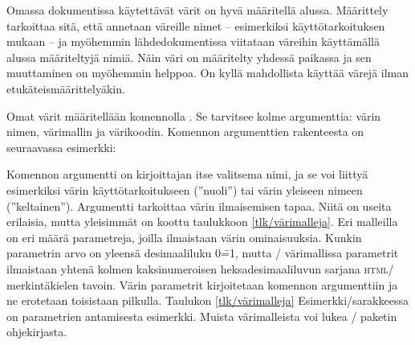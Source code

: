 Omassa dokumentissa käytettävät värit on hyvä määritellä alussa.
Määrittely tarkoittaa sitä, että annetaan väreille nimet -- esimerkiksi
käyttötarkoituksen mukaan -- ja myöhemmin lähdedokumentissa viitataan
väreihin käyttämällä alussa määriteltyjä nimiä. Näin väri on määritelty
yhdessä paikassa ja sen muuttaminen on myöhemmin helppoa. On kyllä
mahdollista käyttää värejä ilman etukäteismäärittelyäkin.


Omat värit määritellään komennolla . Se tarvitsee
kolme argumenttia: värin nimen, värimallin ja värikoodin. Komennon
argumenttien rakenteesta on seuraavassa esimerkki:

\begin{koodilohkosis}
\end{koodilohkosis}

Komennon argumentti  on kirjoittajan itse valitsema nimi,
ja se voi liittyä esimerkiksi värin käyttötarkoitukseen (''nuoli'') tai
värin yleiseen nimeen (''keltainen''). Argumentti 
tarkoittaa värin ilmaisemisen tapaa. Niitä on useita erilaisia, mutta
yleisimmät on koottu taulukkoon \ref{tlk/värimalleja}. Eri malleilla on
eri määrä parametreja, joilla ilmaistaan värin ominaisuuksia. Kunkin
parametrin arvo on yleensä desimaaliluku 0\==1, mutta \-/
värimallissa parametrit ilmaistaan yhtenä kolmen kaksinumeroisen
heksadesimaaliluvun sarjana \textsc{html}\-/ merkintäkielen tavoin.
Värin parametrit kirjoitetaan komennon argumenttiin
 ja ne erotetaan toisistaan pilkulla. Taulukon
\ref{tlk/värimalleja} Esimerkki\-/sarakkeessa on parametrien antamisesta
esimerkki. Muista värimalleista voi lukea \-/ paketin
ohjekirjasta.

